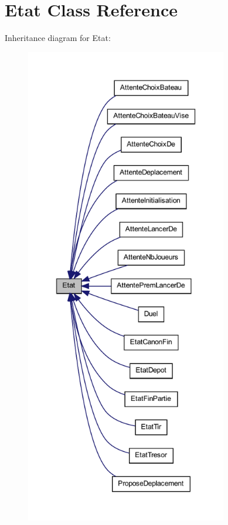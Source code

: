 \hypertarget{class_etat}{
\section{Etat Class Reference}
\label{class_etat}
}


Inheritance diagram for Etat:
\nopagebreak
\begin{figure}[H]
\begin{center}
\leavevmode
\includegraphics[height=600pt]{class_etat__inherit__graph}
\end{center}
\end{figure}


